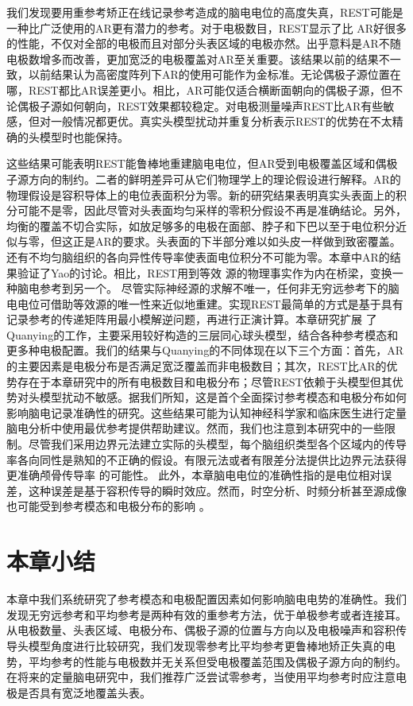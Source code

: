我们发现要用重参考矫正在线记录参考造成的脑电电位的高度失真，REST可能是一种比广泛使用的AR更有潜力的参考。对于电极数目，REST显示了比
AR好很多的性能，不仅对全部的电极而且对部分头表区域的电极亦然。出乎意料是AR不随电极数增多而改善，更加宽泛的电极覆盖对AR至关重要。该结果以前的结果不一致，以前结果认为高密度阵列下AR的使用可能作为金标准。无论偶极子源位置在哪，REST都比AR误差更小。相比，AR可能仅适合横断面朝向的偶极子源，但不论偶极子源如何朝向，REST效果都较稳定。对电极测量噪声REST比AR有些敏感，但对一般情况都更优。真实头模型扰动并重复分析表示REST的优势在不太精确的头模型时也能保持。

这些结果可能表明REST能鲁棒地重建脑电电位，但AR受到电极覆盖区域和偶极子源方向的制约。二者的鲜明差异可从它们物理学上的理论假设进行解释。AR的物理假设是容积导体上的电位表面积分为零。新的研究结果表明真实头表面上的积分可能不是零，因此尽管对头表面均匀采样的零积分假设不再是准确结论。另外，均衡的覆盖不切合实际，如放足够多的电极在面部、脖子和下巴以至于电位积分近似与零，但这正是AR的要求。头表面的下半部分难以如头皮一样做到致密覆盖。还有不均匀脑组织的各向异性传导率使表面电位积分不可能为零。本章中AR的结果验证了Yao的讨论。相比，REST用到等效
源的物理事实作为内在桥梁，变换一种脑电参考到另一个。 尽管实际神经源的求解不唯一，任何非无穷远参考下的脑电电位可借助等效源的唯一性来近似地重建。实现REST最简单的方式是基于具有记录参考的传递矩阵用最小模解逆问题，再进行正演计算。本章研究扩展
了Quanying的工作，主要采用较好构造的三层同心球头模型，结合各种参考模态和更多种电极配置。我们的结果与Quanying的不同体现在以下三个方面：首先，AR的主要因素是电极分布是否满足宽泛覆盖而非电极数目；其次，REST比AR的优势存在于本章研究中的所有电极数目和电极分布；尽管REST依赖于头模型但其优势对头模型扰动不敏感。据我们所知，这是首个全面探讨参考模态和电极分布如何影响脑电记录准确性的研究。这些结果可能为认知神经科学家和临床医生进行定量脑电分析中使用最优参考提供帮助建议。然而，我们也注意到本研究中的一些限制。尽管我们采用边界元法建立实际的头模型，每个脑组织类型各个区域内的传导率各向同性是熟知的不正确的假设。有限元法或者有限差分法提供比边界元法获得更准确颅骨传导率
的可能性。 此外，本章脑电电位的准确性指的是电位相对误差，这种误差是基于容积传导的瞬时效应。然而，时空分析、时频分析甚至源成像也可能受到参考模态和电极分布的影响 。
\section{本章小结}
本章中我们系统研究了参考模态和电极配置因素如何影响脑电电势的准确性。我们发现无穷远参考和平均参考是两种有效的重参考方法，优于单极参考或者连接耳。从电极数量、头表区域、电极分布、偶极子源的位置与方向以及电极噪声和容积传导头模型角度进行比较研究，我们发现零参考比平均参考更鲁棒地矫正失真的电势，平均参考的性能与电极数并无关系但受电极覆盖范围及偶极子源方向的制约。在将来的定量脑电研究中，我们推荐广泛尝试零参考，当使用平均参考时应注意电极是否具有宽泛地覆盖头表。